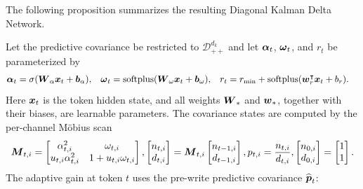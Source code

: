 \documentclass{article} %
\begin{document}
The following proposition summarizes the resulting Diagonal Kalman Delta Network.

\label{prop:kalman-linear-attention}
\begin{tcolorbox}[
  title={Proposition~\thedefinition: Diagonal Kalman Delta Network},
  breakable,
  colback=blue!7,
  colbacktitle=blue!22,
  colframe=blue!45!black,
  coltitle=black,
  fonttitle=\bfseries,
  boxrule=0.4pt,
  arc=1pt,
  left=5pt,
  right=5pt,
  top=5pt,
  bottom=5pt
]
Let the predictive covariance be restricted to $\mathcal{D}_{++}^{d_k}$ and let
$\boldsymbol{\alpha}_t$, $\boldsymbol{\omega}_t$, and $r_t$ be parameterized by
\begin{equation}
\begin{aligned}
  \boldsymbol{\alpha}_t &= \sigma(\boldsymbol{W}_{\alpha}\boldsymbol{x}_t+\boldsymbol{b}_{\alpha}),
  &
  \boldsymbol{\omega}_t &= \operatorname{softplus}(\boldsymbol{W}_{\omega}\boldsymbol{x}_t+\boldsymbol{b}_{\omega}),
  &
  r_t &= r_{\min}+\operatorname{softplus}(\boldsymbol{w}_{r}^{\intercal}\boldsymbol{x}_t+b_r).
\end{aligned}
\label{eq:kla-box-parameterization}
\end{equation}
Here $\boldsymbol{x}_t$ is the token hidden state, and all weights $\boldsymbol{W}_{\ast}$ and
$\boldsymbol{w}_{\ast}$, together with their biases, are learnable parameters.
The covariance states are computed by the per-channel M\"obius scan
\begin{equation}
  \boldsymbol{M}_{t,i}
  =
  \begin{bmatrix}
    \alpha_{t,i}^2 & \omega_{t,i}\\
    u_{t,i}\alpha_{t,i}^2 & 1+u_{t,i}\omega_{t,i}
  \end{bmatrix},
  \begin{bmatrix}n_{t,i}\\ d_{t,i}\end{bmatrix}
  =
  \boldsymbol{M}_{t,i}
  \begin{bmatrix}n_{t-1,i}\\ d_{t-1,i}\end{bmatrix},
  p_{t,i}=\frac{n_{t,i}}{d_{t,i}},
  \begin{bmatrix}n_{0,i}\\ d_{0,i}\end{bmatrix}
  =
  \begin{bmatrix}1\\ 1\end{bmatrix}.
  \label{eq:kla-box-mobius}
\end{equation}
The adaptive gain at token $t$ uses the pre-write predictive covariance $\widehat{\boldsymbol{p}}_t$:
\begin{equation}

\end{equation}
\end{tcolorbox}
\end{document}
